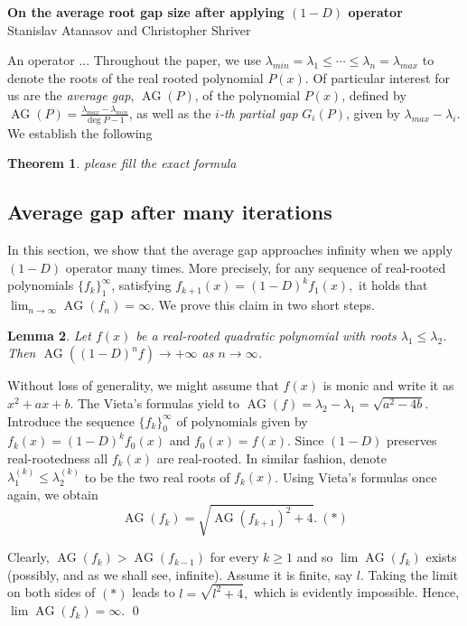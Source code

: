 \documentclass[11pt]{article}
\DeclareMathOperator{\AG}{AG}
\newtheorem{theorem}{Theorem}[section]
\newtheorem{lemma}[theorem]{Lemma}
\begin{document}
\begin{center}
\textbf{On the average root gap size after applying $(1-D)$ operator}\\
Stanislav Atanasov and Christopher Shriver
\end{center}

An operator ...
Throughout the paper, we use $\lambda_{min}=\lambda_1\leq \cdots \leq \lambda_n = \lambda_{max}$ to denote the roots of the real rooted polynomial $P(x)$. Of particular interest for us are the \emph{average gap}, $\AG(P)$, of the polynomial $P(x)$, defined by $\AG(P)=\frac{\lambda_{max} - \lambda_{min}}{\deg P - 1}$, as well as the \emph{$i$-th partial gap} $G_i(P)$, given by $\lambda_{max}-\lambda_i$. We establish the following

\begin{theorem}
please fill the exact formula
\end{theorem}

\subsection{Average gap after many iterations}
 In this section, we show that the average gap approaches infinity when we apply $(1-D)$ operator many times. More precisely, for any sequence of real-rooted polynomials $\{f_k\}_1^{\infty}$, satisfying $f_{k+1}(x) = (1-D)^k f_{1}(x),$ it holds that $\lim_{n\to \infty} \AG(f_n) = \infty$. We prove this claim in two short steps.

 \begin{lemma}
 \label{degree two avg distance}
 Let $f(x)$ be a real-rooted quadratic polynomial with roots $\lambda_1 \leq \lambda_2$. Then $\AG((1-D)^n f) \to +\infty$ as ${n\to \infty}$.
 \end{lemma}
\proof
Without loss of generality, we might assume that $f(x)$ is monic and write it as $x^2+ax+b$. The Vieta's formulas yield to $\AG(f) = \lambda_2 - \lambda_1 = \sqrt{a^2 - 4b}$. Introduce the sequence $\{f_k\}_{0}^\infty$ of polynomials given by $f_{k} (x)= (1-D)^k f_0(x)$ and $f_0(x) = f(x)$. Since $(1-D)$ preserves real-rootedness all $f_k(x)$ are real-rooted. In similar fashion, denote $\lambda_1^{(k)} \leq \lambda_2^{(k)}$ to be the two real roots of $f_k(x)$. Using Vieta's formulas once again, we obtain
 \[\AG(f_k) = \sqrt{\AG(f_{k+1})^2 + 4}.~(*)\]

 Clearly, $\AG(f_k) > \AG(f_{k-1})$ for every $k\ge 1$ and so  $\lim \AG(f_k)$ exists (possibly, and as we shall see, infinite). Assume it is finite, say $l$. Taking the limit on both sides of $(*)$ leads to $l = \sqrt{l^2 + 4},$ which is evidently impossible. Hence, $\lim \AG(f_k) = \infty$. \qed
\end{document}
